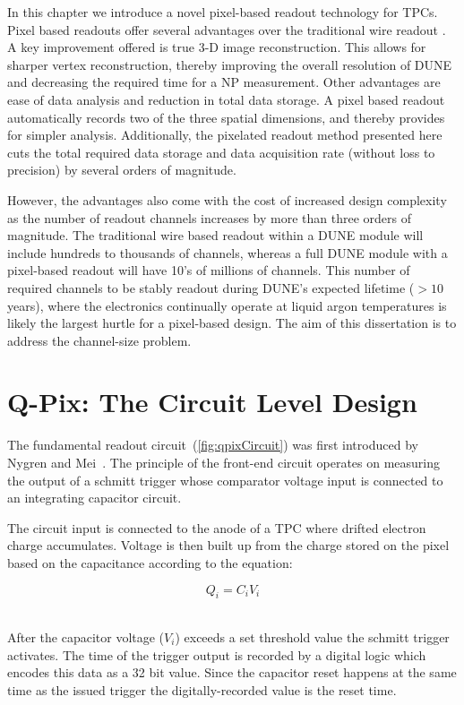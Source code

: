 In this chapter we introduce a novel pixel-based readout technology for TPCs.
Pixel based readouts offer several advantages over the traditional wire readout \citep{lartpc_recon_problems_joshi_2015}.
A key improvement offered is true 3-D image reconstruction.
This allows for sharper vertex reconstruction, thereby improving the overall resolution of DUNE and decreasing the required time for a NP measurement.
Other advantages are ease of data analysis and reduction in total data storage.
A pixel based readout automatically records two of the three spatial dimensions, and thereby provides for simpler analysis.
Additionally, the pixelated readout method presented here cuts the total required data storage and data acquisition rate (without loss to precision) by several orders of magnitude.

However, the advantages also come with the cost of increased design complexity as the number of readout channels increases by more than three orders of magnitude. 
The traditional wire based readout within a DUNE module will include hundreds to thousands of channels, whereas a full DUNE module with a pixel-based readout will have 10's of millions of channels.
This number of required channels to be stably readout during DUNE's expected lifetime ($> 10$ years), where the electronics continually operate at liquid argon temperatures is likely the largest hurtle for a pixel-based design.
The aim of this dissertation is to address the channel-size problem.

\section{Q-Pix: The Circuit Level Design}

The fundamental readout circuit~(\ref{fig:qpixCircuit}) was first introduced by Nygren and Mei~\citep{qpix:nygren:mei}.
The principle of the front-end circuit operates on measuring the output of a schmitt trigger whose comparator voltage input is connected to an integrating capacitor circuit.

The circuit input is connected to the anode of a TPC where drifted electron charge accumulates.
Voltage is then built up from the charge stored on the pixel based on the capacitance according to the equation:

\begin{equation}
Q_{i} = C_{i}V_{i}
\end{equation}
~\label{eq:capacitor}

After the capacitor voltage ($V_{i}$) exceeds a set threshold value the schmitt trigger activates.
The time of the trigger output is recorded by a digital logic which encodes this data as a 32 bit value.
Since the capacitor reset happens at the same time as the issued trigger the digitally-recorded value is the reset time.

